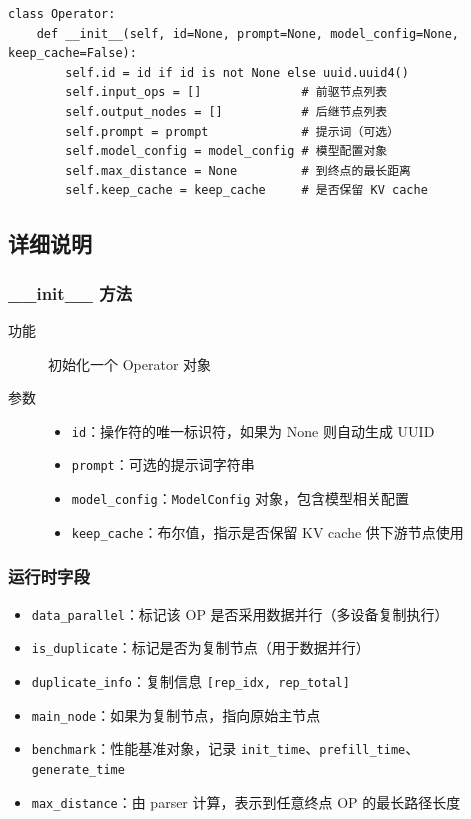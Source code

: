 \documentclass[12pt,a4paper]{article}
\begin{document}
\begin{lstlisting}
class Operator:
    def __init__(self, id=None, prompt=None, model_config=None, keep_cache=False):
        self.id = id if id is not None else uuid.uuid4()
        self.input_ops = []              # 前驱节点列表
        self.output_nodes = []           # 后继节点列表
        self.prompt = prompt             # 提示词（可选）
        self.model_config = model_config # 模型配置对象
        self.max_distance = None         # 到终点的最长距离
        self.keep_cache = keep_cache     # 是否保留 KV cache
\end{lstlisting}

\subsection{详细说明}

\subsubsection{\_\_init\_\_ 方法}
\begin{description}
    \item[功能] 初始化一个 Operator 对象
    \item[参数]
    \begin{itemize}
        \item \texttt{id}：操作符的唯一标识符，如果为 None 则自动生成 UUID
        \item \texttt{prompt}：可选的提示词字符串
        \item \texttt{model\_config}：\texttt{ModelConfig} 对象，包含模型相关配置
        \item \texttt{keep\_cache}：布尔值，指示是否保留 KV cache 供下游节点使用
    \end{itemize}
\end{description}

\subsubsection{运行时字段}
\begin{itemize}
    \item \texttt{data\_parallel}：标记该 OP 是否采用数据并行（多设备复制执行）
    \item \texttt{is\_duplicate}：标记是否为复制节点（用于数据并行）
    \item \texttt{duplicate\_info}：复制信息 \texttt{[rep\_idx, rep\_total]}
    \item \texttt{main\_node}：如果为复制节点，指向原始主节点
    \item \texttt{benchmark}：性能基准对象，记录 \texttt{init\_time}、\texttt{prefill\_time}、\texttt{generate\_time}
    \item \texttt{max\_distance}：由 parser 计算，表示到任意终点 OP 的最长路径长度
\end{itemize}
\end{document}
